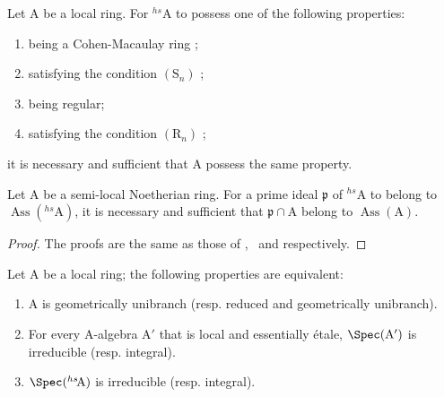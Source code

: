 \begin{corollary}[18.8.13]
\label{IV.18.8.13}
Let $\mathrm{A}$ be a local ring.
For ${}^{hs}\!\mathrm{A}$ to possess one of the following properties:
\begin{enumerate}[label=\emph{\alph*)}]
  \item being a Cohen-Macaulay ring ;
  \item satisfying the condition $(\mathrm{S}_n)$ ;
  \item being regular;
  \item satisfying the condition $(\mathrm{R}_n)$ ;
\end{enumerate}
it is necessary and sufficient that A possess the same property.
\end{corollary}

\begin{corollary}[18.8.14]
\label{IV.18.8.14}
Let $\mathrm{A}$ be a semi-local Noetherian ring.
For a prime ideal $\mathfrak{p}$ of ${}^{hs}\!\mathrm{A}$ to belong to $\operatorname{Ass}({}^{hs}\!\mathrm{A})$, it is necessary and sufficient that $\mathfrak{p}\cap\mathrm{A}$ belong to $\operatorname{Ass}(\mathrm{A})$.
\end{corollary}

\begin{proof}
The proofs are the same as those of ,~ and  respectively.
\end{proof}

\begin{proposition}[18.8.15]
\label{IV.18.8.15}
Let $\mathrm{A}$ be a local ring;
the following properties are equivalent:
\begin{enumerate}[label=\emph{\alph*)}]
  \item A is geometrically unibranch (resp. reduced and geometrically unibranch).
  \item For every A-algebra $\mathrm{A}'$ that is local and essentially \'{e}tale, $\Spec(\mathrm{A}')$ is irreducible (resp. integral).
  \item $\Spec({}^{hs}\!\mathrm{A})$ is irreducible (resp. integral).
\end{enumerate}
\end{proposition}

